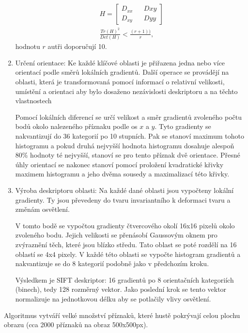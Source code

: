 \begin{enumerate}
			\begin{align}
			H = \begin{bmatrix}
			D_{xx} && D{xy} \\
			D_{xy} && D{yy}
			\end{bmatrix}\\
			\frac{Tr(H)^2}{Det(H)} < \frac{(r+1))}{r},
			\end{align}
			hodnotu $r$ autři doporučují 10.
								
		\item Určení orientace: Ke každé klíčové oblasti je přiřazena jedna nebo více orientací podle směrů lokálních gradientů. Další operace se provádějí na oblasti, která je transformovaná pomocí informací o relativní velikosti, umístění a orientaci aby bylo dosaženo nezávislosti deskriptoru a na těchto  vlastnostech
		
			Pomocí lokálních diferencí se určí velikost a směr gradientů zvoleného počtu bodů okolo nalezeného příznaku podle os $x$ a $y$. Tyto gradienty se nakvantizují do 36 kategorií po 10 stupních. Pak se stanoví maximum tohoto histogramu a pokud druhá nejvyšší hodnota histogramu dosahuje alespoň 80\% hodnoty té nejvyšší, stanoví se pro tento příznak dvě orientace. Přesné úhly orientací se nakonec stanoví pomocí proložení kvadratické křivky maximem histogramu a jeho dvěma sousedy a maximalizací této křivky.	
					
		\item Výroba deskriptoru oblasti: Na každé dané oblasti jsou vypočteny lokální gradienty. Ty jsou převedeny do tvaru invariantního k deformaci tvaru a změnám osvětlení.
		
			V tomto bodě se vypočtou gradienty čtvercového okolí 16x16 pixelů okolo zvoleného bodu. Jejich velikosti se přenásobí Gaussovým oknem pro zvýraznění těch, které jsou blízko středu. Tato oblast se poté rozdělí na 16 oblastí se 4x4 pixely. V každé této oblasti se vypočte histogram gradientů a nakvantizuje se do 8 kategorií podobně jako v předchozím kroku.
			
			Výsledkem je SIFT deskriptor: 16 gradientů po 8 orientačních kategoriích (binech), tedy 128 rozměrný vektor. Jako poslední krok se tento vektor normalizuje na jednotkovou délku aby se potlačily vlivy osvětlení. 
			
			
	\end{enumerate}
	
	Algoritmus vytváří velké množství příznaků, které hustě pokrývají celou plochu
	obrazu (cca 2000 příznaků na obraz 500x500px).
	
